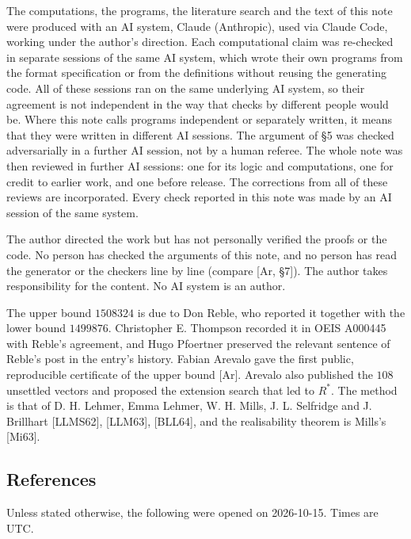 \documentclass[
]{amsart}
\begin{document}
The computations, the programs, the literature search and the text of
this note were produced with an AI system, Claude (Anthropic), used via
Claude Code, working under the author's direction. Each computational
claim was re-checked in separate sessions of the same AI system, which
wrote their own programs from the format specification or from the
definitions without reusing the generating code. All of these sessions
ran on the same underlying AI system, so their agreement is not
independent in the way that checks by different people would be. Where
this note calls programs independent or separately written, it means
that they were written in different AI sessions. The argument of §5 was
checked adversarially in a further AI session, not by a human referee.
The whole note was then reviewed in further AI sessions: one for its
logic and computations, one for credit to earlier work, and one before
release. The corrections from all of these reviews are incorporated.
Every check reported in this note was made by an AI session of the same
system.

The author directed the work but has not personally verified the proofs
or the code. No person has checked the arguments of this note, and no
person has read the generator or the checkers line by line (compare
{[}Ar, §7{]}). The author takes responsibility for the content. No AI
system is an author.

The upper bound \(1508324\) is due to Don Reble, who reported it
together with the lower bound \(1499876\). Christopher E. Thompson
recorded it in OEIS A000445 with Reble's agreement, and Hugo Pfoertner
preserved the relevant sentence of Reble's post in the entry's history.
Fabian Arevalo gave the first public, reproducible certificate of the
upper bound {[}Ar{]}. Arevalo also published the \(108\) unsettled
vectors and proposed the extension search that led to \(R^*\). The
method is that of D. H. Lehmer, Emma Lehmer, W. H. Mills, J. L.
Selfridge and J. Brillhart {[}LLMS62{]}, {[}LLM63{]}, {[}BLL64{]}, and
the realisability theorem is Mills's {[}Mi63{]}.

\hypertarget{references}{%
\subsection{References}\label{references}}

Unless stated otherwise, the following were opened on 2026-10-15. Times
are UTC.
\end{document}
